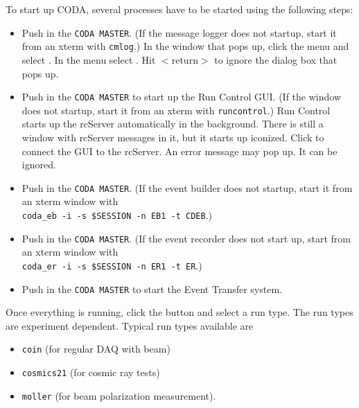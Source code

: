 To start up CODA, several processes have to be started using the following
steps:
\begin{itemize}
\item Push {\bf{}} in the \verb|CODA MASTER|.  
(If the message logger does not startup, start it from an
xterm with \verb|cmlog|.)
In the window that pops up, click the  menu and 
select . In the menu  select .  
Hit $<$return$>$ to ignore the dialog box that pops up. 



\item Push {\bf{}} in the \verb|CODA MASTER| to start up the
Run Control GUI. 
(If the window does not startup, start it from an xterm with 
\verb|runcontrol|.) Run Control starts up the rcServer automatically in the 
background. There is still a window with rcServer messages in it, but it 
starts up iconized.
Click  to connect the GUI to the rcServer. An error message
may pop up. It can be ignored.  

\item Push {\bf{}} in the \verb|CODA MASTER|.  (If the
event builder does not startup, start it from an xterm window with\\
\verb|coda_eb -i -s $SESSION -n EB1 -t CDEB|.)

\item Push {\bf{}} in the \verb|CODA MASTER|. 
(If the event recorder does not start up, start from an xterm window with\\
\verb|coda_er -i -s $SESSION -n ER1 -t ER|.)

\item Push {\bf{}} in the \verb|CODA MASTER| to start the
Event Transfer system. 
\end{itemize}


Once everything is running, click the  button and select a
run type.   The run types are experiment dependent. 
Typical run types available are
\begin{itemize}
\item \verb|coin| (for regular DAQ with beam)
\item \verb|cosmics21| (for cosmic ray tests)
\item \verb|moller| (for beam polarization measurement).
\end{itemize}

